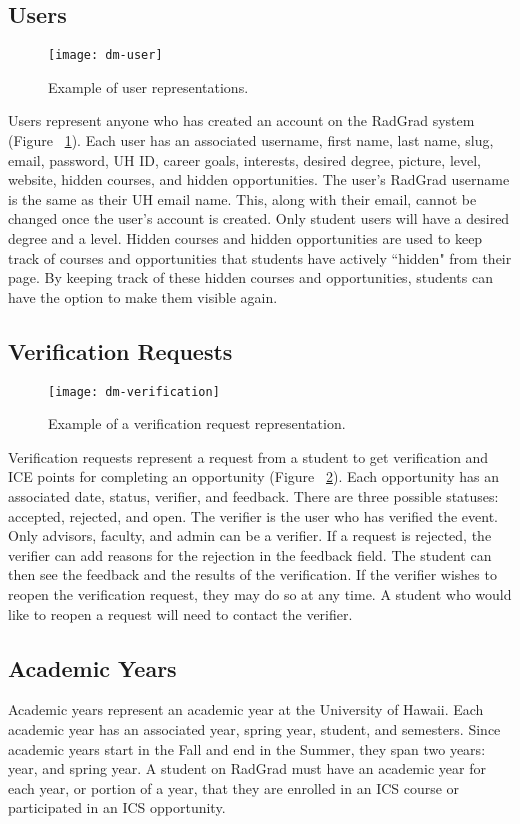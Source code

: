 \subsection{Users}
\begin{figure}[htbp!]
\centering
\texttt{[image: dm-user]}
\caption{Example of user representations.}
\label{user}
\end{figure}
Users represent anyone who has created an account on the RadGrad system (Figure ~\ref{user}). Each user has an associated username, first name, last name, slug, email, password, UH ID, career goals, interests, desired degree, picture, level, website, hidden courses, and hidden opportunities. The user's RadGrad username is the same as their UH email name. This, along with their email, cannot be changed once the user's account is created. Only student users will have a desired degree and a level. Hidden courses and hidden opportunities are used to keep track of courses and opportunities that students have actively ``hidden" from their page. By keeping track of these hidden courses and opportunities, students can have the option to make them visible again.

\subsection{Verification Requests}
\begin{figure}[htbp!]
\centering
\texttt{[image: dm-verification]}
\caption{Example of a verification request representation.}
\label{verification-request}
\end{figure}
Verification requests represent a request from a student to get verification and ICE points for completing an opportunity (Figure ~\ref{verification-request}). Each opportunity has an associated date, status, verifier, and feedback. There are three possible statuses: accepted, rejected, and open. The verifier is the user who has verified the event. Only advisors, faculty, and admin can be a verifier. If a request is rejected, the verifier can add reasons for the rejection in the feedback field. The student can then see the feedback and the results of the verification. If the verifier wishes to reopen the verification request, they may do so at any time. A student who would like to reopen a request will need to contact the verifier.  

\subsection{Academic Years}
Academic years represent an academic year at the University of Hawaii. Each academic year has an associated year, spring year, student, and semesters. Since academic years start in the Fall and end in the Summer, they span two years: year, and spring year. A student on RadGrad must have an academic year for each year, or portion of a year, that they are enrolled in an ICS course or participated in an ICS opportunity.

